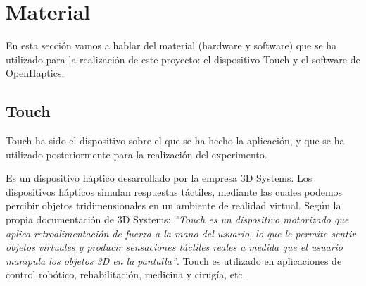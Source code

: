 \documentclass[a4paper,11pt, oneside]{book}
\begin{document}
\section{Material}

En esta sección vamos a hablar del material (hardware y software) que se ha utilizado para la realización de este proyecto: el dispositivo Touch y el software de OpenHaptics.

\subsection{Touch}

Touch\cite{Touch} ha sido el dispositivo sobre el que se ha hecho la aplicación, y que se ha utilizado posteriormente para la realización del experimento.

Es un dispositivo háptico desarrollado por la empresa 3D Systems\cite{3DSystems}. Los dispositivos hápticos simulan respuestas táctiles, mediante las cuales podemos percibir objetos tridimensionales en un ambiente de realidad virtual.
Según la propia documentación de 3D Systems: \textit{''Touch es un dispositivo motorizado que aplica retroalimentación de fuerza a la mano del usuario, lo que le permite sentir objetos virtuales y producir sensaciones táctiles reales a medida que el usuario manipula los objetos 3D en la pantalla''}. Touch es utilizado en aplicaciones de control robótico, rehabilitación, medicina y cirugía, etc.
\end{document}
